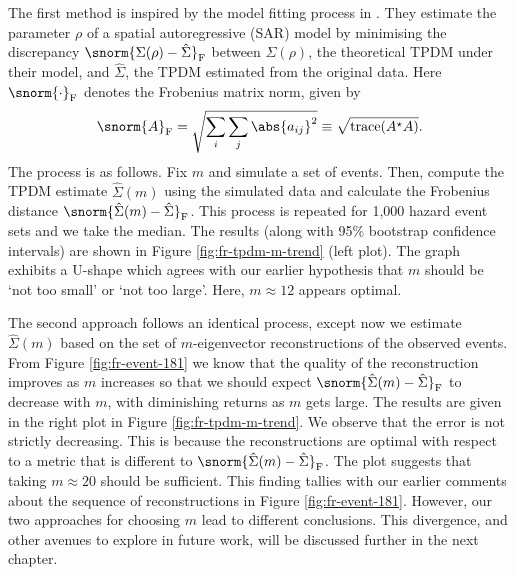 \documentclass[en-GB, a4paper, nobind]{templates/bathreport}
\begin{document}
The first method is inspired by the model fitting process in \textcite{fixSimultaneousAutoregressiveModels2021}. They estimate the parameter \(\rho\) of a spatial autoregressive (SAR) model by minimising the discrepancy \(\snorm{\Sigma(\rho)-\hat{\Sigma}}_\mathrm{F}\) between \(\Sigma(\rho)\), the theoretical TPDM under their model, and \(\hat{\Sigma}\), the TPDM estimated from the original data. Here \(\snorm{\cdot}_\mathrm{F}\) denotes the Frobenius matrix norm, given by
\begin{equation*}
\snorm{A}_\mathrm{F} = \sqrt{\sum_i\sum_j \abs{a_{ij}}^2} \equiv \sqrt{\mathrm{trace}(A^\star A)}.
\end{equation*}
The process is as follows. Fix \(m\) and simulate a set of events. Then, compute the TPDM estimate \(\hat{\Sigma}(m)\) using the simulated data and calculate the Frobenius distance \(\snorm{\hat{\Sigma}(m)-\hat{\Sigma}}_\mathrm{F}\). This process is repeated for 1,000 hazard event sets and we take the median. The results (along with 95\% bootstrap confidence intervals) are shown in Figure \ref{fig:fr-tpdm-m-trend} (left plot). The graph exhibits a U-shape which agrees with our earlier hypothesis that \(m\) should be `not too small' or `not too large'. Here, \(m\approx 12\) appears optimal.

The second approach follows an identical process, except now we estimate \(\hat{\Sigma}(m)\) based on the set of \(m\)-eigenvector reconstructions of the observed events. From Figure \ref{fig:fr-event-181} we know that the quality of the reconstruction improves as \(m\) increases so that we should expect \(\snorm{\hat{\Sigma}(m)-\hat{\Sigma}}_\mathrm{F}\) to decrease with \(m\), with diminishing returns as \(m\) gets large. The results are given in the right plot in Figure \ref{fig:fr-tpdm-m-trend}. We observe that the error is not strictly decreasing. This is because the reconstructions are optimal with respect to a metric that is different to \(\snorm{\hat{\Sigma}(m)-\hat{\Sigma}}_\mathrm{F}\). The plot suggests that taking \(m\approx 20\) should be sufficient. This finding tallies with our earlier comments about the sequence of reconstructions in Figure \ref{fig:fr-event-181}. However, our two approaches for choosing \(m\) lead to different conclusions. This divergence, and other avenues to explore in future work, will be discussed further in the next chapter.
\end{document}
